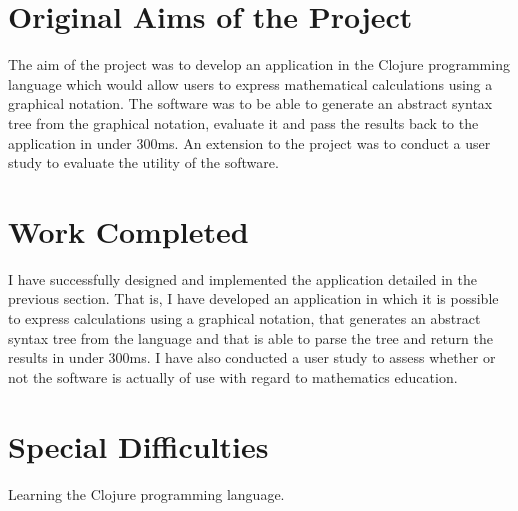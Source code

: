 \documentclass[12pt,twoside,notitlepage,xetex]{report}
\begin{document}
\section*{Original Aims of the Project}

The aim of the project was to develop an application in the Clojure programming
language which would allow users to express mathematical calculations using a
graphical notation.  The software was to be able to generate an abstract syntax
tree from the graphical notation, evaluate it and pass the results back to the
application in under 300ms.  An extension to the project was to conduct a user
study to evaluate the utility of the software.
%


\section*{Work Completed}

I have successfully designed and implemented the application detailed in the
previous section.  That is, I have developed an application in which it is
possible to express calculations using a graphical notation, that generates an
abstract syntax tree from the language and that is able to parse the tree and
return the results in under 300ms.  I have also conducted a user study to assess
whether or not the software is actually of use with regard to mathematics
education.
%

\section*{Special Difficulties}

Learning the Clojure programming language.
%
\end{document}
